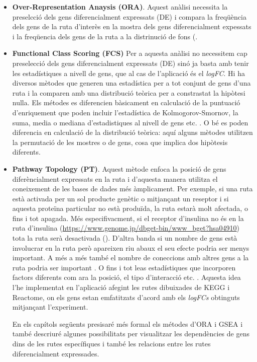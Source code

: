 \begin{itemize}
\item \textbf{Over-Representation Anaysis (ORA)}.
Aquest anàlisi necessita la preselcció dels gens diferencialment expressats (DE) i compara la freqüència dels gens de la ruta d'interès en la mostra dels gens diferencialment expessats i la freqüencia dels gens de la ruta a la distrinució de fons (\cite{boyle2004go}. 
\item \textbf{Functional Class Scoring (FCS)}
Per a aquesta anàlisi no necessitem cap preselecció dels gens diferencialment expressats (DE) sinó ja basta amb tenir les estadístiques a nivell de gens, que al cas de l'aplicació és el \textit{logFC}. Hi ha diversos mètodes que generen una estadística per a tot conjunt de gens d'una ruta i la comparen amb una distribució teòrica per a constrastat la hipòtesi nulla. Els métodes es diferencien bàsicament en calculació de la puntuació d'enriquement que poden incluir l'estadística de Kolmogorov-Smornov, la suma, media o mediana d'estadistiques al nivell de gens etc. \cite{khatri2012ten}. O bé es poden diferencia en calculació de la distribució teòrica: aquí alguns mètodes utilitzen la permutació de les mostres  o de gens, cosa que implica dos hipòtesis diferents.  
\item \textbf{Pathway Topology (PT)}.
Aquest mètode enfoca la posició de gens diferèncialment expressats en la ruta i d'aquesta manera utilitza el coneixement de les bases de dades més àmplicament. Per exemple, si una ruta està activada per un sol producte genètic o mitjançant un reseptor i si aquesta proteïna particular no està produïda, la ruta estarà molt afectada, o fins i tot apagada. Més especifivacment, si el receptor d'insulina no és en la ruta d'insulina (\url{https://www.genome.jp/dbget-bin/www_bget?hsa04910}) tota la ruta serà desactivada (\cite{tarca2008novel}). D'altra banda si un nombre de gens està involucrar en la ruta però apareixen riu abaux el seu efecte podria ser menys important. A més a més també el nombre de coneccions amb altres gens a la ruta podria ser important \cite{rahnenfuhrer2004calculating}. O fins i tot leas estadístiques que incorporen factors diferents com ara la posició, el tipo d'interacció etc. \cite{draghici2007systems}. Aquesta idea l'he implementat en l'aplicació afegint les rutes dibuixades de KEGG i Reactome, on els gens estan emfatitzats d'acord amb els \textit{logFCs} obtinguts mitjançant l'experiment.

En els capítols següents presisaré més formal els métodes d'ORA i GSEA i també descriuré algunes possibilitats per visualitzar les dependències de gens dins de les rutes específiques i també les relacions entre les rutes diferencialment expressades.

\end{itemize}


